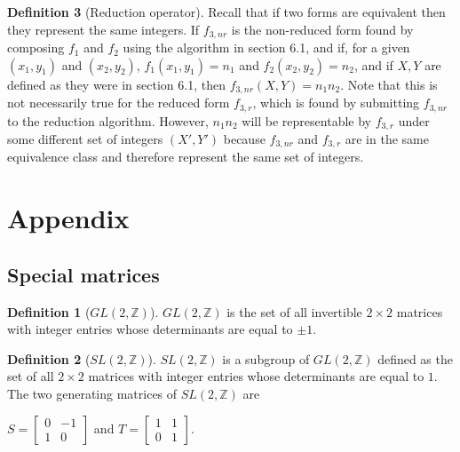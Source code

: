 \documentclass{article}
\theoremstyle{definition}
\newtheorem{definition}{Definition}[section]
\theoremstyle{theorem}
\theoremstyle{example}
\theoremstyle{corollary}
\begin{document}
\begin{definition}[Reduction operator]
\bigskip

Recall that if two forms are equivalent then they represent the same integers. If \(f_{3,nr}\) is the non-reduced form found by composing \(f_{1}\) and \(f_{2}\) using the algorithm in section 6.1, and if, for a given \((x_{1}, y_{1})\) and \((x_{2}, y_{2})\), \(f_{1} (x_{1}, y_{1}) = n_{1}\) and \(f_{2} (x_{2}, y_{2}) = n_{2}\), and if \(X, Y\) are defined as they were in section 6.1, then \(f_{3,nr} (X, Y) = n_{1} n_{2}\). Note that this is not necessarily true for the reduced form \(f_{3,r}\), which is found by submitting \(f_{3,nr}\) to the reduction algorithm. However, \(n_{1} n_{2}\) will be representable by \(f_{3,r}\) under some different set of integers \((X', Y')\) because \(f_{3,nr}\) and \(f_{3,r}\) are in the same equivalence class and therefore represent the same set of integers.

\bigskip






\newpage

\section{Appendix}

\bigskip

\subsection{Special matrices}

\bigskip

\theoremstyle{definition}
\begin{definition}[\(GL(2, \mathbb{Z})\)]
\(GL(2, \mathbb{Z})\) is the set of all invertible \(2 \times 2\) matrices with integer entries whose determinants are equal to \(\pm 1\).
\end{definition}

\bigskip

\theoremstyle{definition}
\begin{definition}[\(SL(2, \mathbb{Z})\)]
\(SL(2, \mathbb{Z})\) is a subgroup of \(GL(2, \mathbb{Z})\) defined as the set of all \(2 \times 2\) matrices with integer entries whose determinants are equal to \(1\). The two generating matrices of \(SL(2, \mathbb{Z})\) are
\begin{center}
\(S = \begin{bmatrix} 0 & -1 \\ 1 & 0 \end{bmatrix}\) \quad and \quad \(T = \begin{bmatrix} 1 & 1 \\ 0 & 1 \end{bmatrix}\).
\end{center}
\end{definition}


\end{definition}
\end{document}
